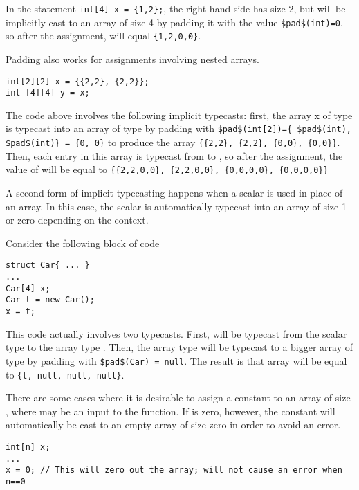 \begin{Example}
In the statement \lstinline!int[4] x = {1,2};!, the right hand side has size 2, but will be implicitly cast to an array of size 4 by padding it with the value \lstinline!$pad$(int)=0!, so after the assignment,  will equal \lstinline!{1,2,0,0}!.
\end{Example}


\begin{Example}
Padding also works for assignments involving nested arrays.
\begin{lstlisting}
int[2][2] x = {{2,2}, {2,2}};
int [4][4] y = x;
\end{lstlisting}

The code above involves the following implicit typecasts: first, the array x of type  is typecast into an array of type  by padding with \lstinline!$pad$(int[2])={ $pad$(int), $pad$(int)} = {0, 0}! to produce the array \lstinline!{{2,2}, {2,2}, {0,0}, {0,0}}!. Then, each entry in this array is typecast from  to , so after the assignment, the value of  will be equal to \lstinline!{{2,2,0,0}, {2,2,0,0}, {0,0,0,0}, {0,0,0,0}}!
\end{Example}


A second form of implicit typecasting happens when a scalar is used in place of an array. In this case, the scalar is automatically typecast into an array of size 1 or zero depending on the context.

\begin{Example}
Consider the following block of code
\begin{lstlisting}
struct Car{ ... }
...
Car[4] x;
Car t = new Car();
x = t;
\end{lstlisting}
This code actually involves two typecasts. First,  will be typecast from the scalar type  to the array type . Then, the array type  will be typecast to a bigger array of type  by padding with \lstinline!$pad$(Car) = null!. The result is that array will be equal to \lstinline!{t, null, null, null}!.
\end{Example}

There are some cases where it is desirable to assign a constant to an array of size , where  may be an input to the function. If  is zero, however, the constant will automatically be cast to an empty array of size zero in order to avoid an error.

\begin{Example}
\begin{lstlisting}
int[n] x;
...
x = 0; // This will zero out the array; will not cause an error when n==0
\end{lstlisting}
\end{Example}


